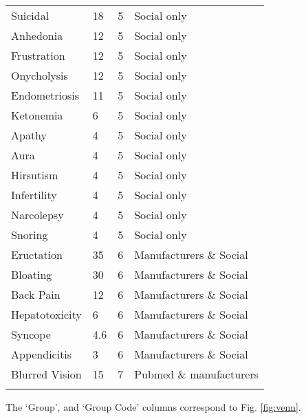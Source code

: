 \documentclass[referee,bst/sn-basic]{sn-jnl}%
\begin{document}
\begin{appendices}
\begin{longtable}{llll}
Suicidal                                 & 18        & 5    & Social only             \\
Anhedonia                                & 12        & 5    & Social only             \\
Frustration                              & 12        & 5    & Social only             \\
Onycholysis                              & 12        & 5    & Social only             \\
Endometriosis                            & 11        & 5    & Social only             \\
Ketonemia                                & 6         & 5    & Social only             \\
Apathy                                   & 4         & 5    & Social only             \\
Aura                                     & 4         & 5    & Social only             \\
Hirsutism                                & 4         & 5    & Social only             \\
Infertility                              & 4         & 5    & Social only             \\
Narcolepsy                               & 4         & 5    & Social only             \\
Snoring                                  & 4         & 5    & Social only             \\
Eructation                               & 35        & 6    & Manufacturers \& Social \\
Bloating                                 & 30        & 6    & Manufacturers \& Social \\
Back Pain                                & 12        & 6    & Manufacturers \& Social \\
Hepatotoxicity                           & 6         & 6    & Manufacturers \& Social \\
Syncope                                  & 4.6       & 6    & Manufacturers \& Social \\
Appendicitis                             & 3         & 6    & Manufacturers \& Social \\
Blurred Vision                           & 15        & 7    & Pubmed \& manufacturers \\ \hline
\label{tbl:ases}
\end{longtable}
The `Group', and `Group Code' columns correspond to Fig. \ref{fig:venn}.

\end{appendices}
\end{document}
